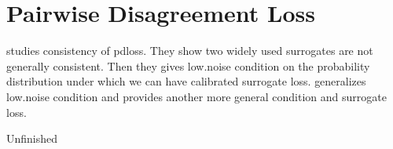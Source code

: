 \section{Pairwise Disagreement Loss}\label{sec:pdloss}

\cite{duchi2010ranking} studies consistency of pdloss. They show two widely used surrogates are not generally consistent. Then they gives low.noise condition on the probability distribution under which we can have calibrated surrogate loss. \cite{ramaswamy2013convex} generalizes low.noise condition and provides another more general condition and surrogate loss. 

Unfinished
